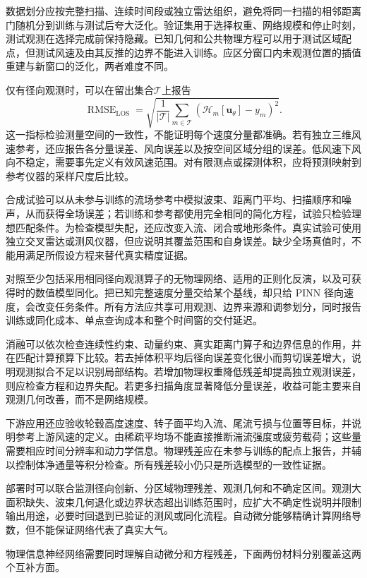 数据划分应按完整扫描、连续时间段或独立雷达组织，避免将同一扫描的相邻距离门随机分到训练与测试后夸大泛化。验证集用于选择权重、网络规模和停止时刻，测试观测在选择完成前保持隐藏。已知几何和公共物理方程可以用于测试区域配点，但测试风速及由其反推的边界不能进入训练。应区分窗口内未观测位置的插值重建与新窗口的泛化，两者难度不同。

仅有径向观测时，可以在留出集合$\mathcal T$上报告
\begin{equation}
 \operatorname{RMSE}_{\mathrm{LOS}}
 =\sqrt{\frac1{|\mathcal T|}\sum_{m\in\mathcal T}
 (\mathcal H_m[\mathbf u_\theta]-y_m)^2}.
\end{equation}
这一指标检验测量空间的一致性，不能证明每个速度分量都准确。若有独立三维风速参考，还应报告各分量误差、风向误差以及按空间区域分组的误差。低风速下风向不稳定，需要事先定义有效风速范围。对有限测点或探测体积，应将预测映射到参考仪器的采样尺度后比较。

合成试验可以从未参与训练的流场参考中模拟波束、距离门平均、扫描顺序和噪声，从而获得全场误差；若训练和参考都使用完全相同的简化方程，试验只检验理想匹配条件。为检查模型失配，还应改变入流、闭合或地形条件。真实试验可使用独立交叉雷达或测风仪器，但应说明其覆盖范围和自身误差。缺少全场真值时，不能用满足所假设方程来替代真实精度证据。

对照至少包括采用相同径向观测算子的无物理网络、适用的正则化反演，以及可获得时的数值模型同化。把已知完整速度分量交给某个基线，却只给 PINN 径向速度，会改变任务条件。所有方法应共享可用观测、边界来源和调参划分，同时报告训练或同化成本、单点查询成本和整个时间窗的交付延迟。

消融可以依次检查连续性约束、动量约束、真实距离门算子和边界信息的作用，并在匹配计算预算下比较。若去掉体积平均后径向误差变化很小而剪切误差增大，说明观测拟合不足以识别局部结构。若增加物理权重降低残差却提高独立观测误差，则应检查方程和边界失配。若更多扫描角度显著降低分量误差，收益可能主要来自观测几何改善，而不是网络规模。

下游应用还应验收轮毂高度速度、转子面平均入流、尾流亏损与位置等目标，并说明参考上游风速的定义。由稀疏平均场不能直接推断湍流强度或疲劳载荷；这些量需要相应时间分辨率和动力学信息。物理残差应在未参与训练的配点上报告，并辅以控制体净通量等积分检查。所有残差较小仍只是所选模型的一致性证据。

部署时可以联合监测径向创新、分区域物理残差、观测几何和不确定区间。观测大面积缺失、波束几何退化或边界状态超出训练范围时，应扩大不确定性说明并限制输出用途，必要时回退到已验证的测风或同化流程。自动微分能够精确计算网络导数，但不能保证网络代表了真实大气。

物理信息神经网络需要同时理解自动微分和方程残差，下面两份材料分别覆盖这两个互补方面。
